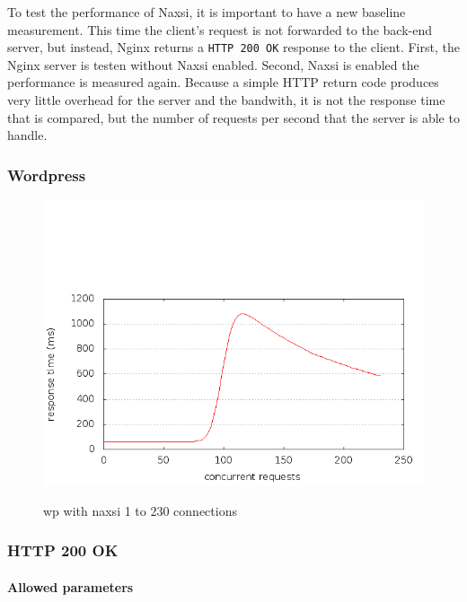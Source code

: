 \documentclass[Measurements]{subfiles}
\begin{document}
To test the performance of Naxsi, it is important to have a new baseline measurement. This time the client's request is not forwarded to the back-end server, but instead, Nginx returns a \verb+HTTP 200 OK+ response to the client. First, the Nginx server is testen without Naxsi enabled. Second, Naxsi is enabled the performance is measured again. Because a simple HTTP return code produces very little overhead for the server and the bandwith, it is not the response time that is compared, but the number of requests per second that the server is able to handle.

\subsubsection{Wordpress}
\begin{figure}[H]
\caption{wp with naxsi 1 to 230 connections}
\centering
\includegraphics[scale=0.55] {images/results/wp_with_naxsi_1_to_230_concurrent_connections/output.png}
\label{fig:Baseline performance measurement}
\end{figure}

\subsubsection{HTTP 200 OK}

\paragraph{Allowed parameters}
\end{document}
